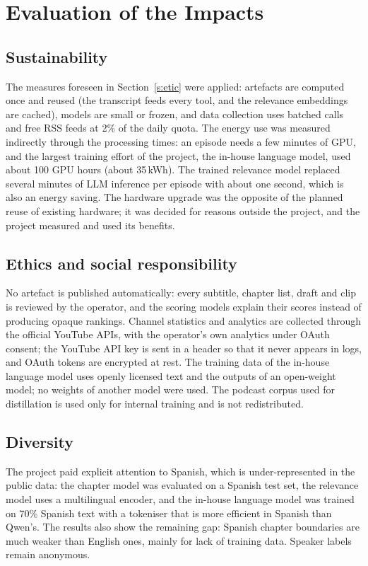 \section{Evaluation of the Impacts}

\subsection*{Sustainability}

The measures foreseen in Section~\ref{s:etic} were applied: artefacts are computed once and reused (the transcript feeds every tool, and the relevance embeddings are cached), models are small or frozen, and data collection uses batched calls and free RSS feeds at 2\% of the daily quota. The energy use was measured indirectly through the processing times: an episode needs a few minutes of GPU, and the largest training effort of the project, the in-house language model, used about 100 GPU hours (about 35\,kWh). The trained relevance model replaced several minutes of LLM inference per episode with about one second, which is also an energy saving. The hardware upgrade was the opposite of the planned reuse of existing hardware; it was decided for reasons outside the project, and the project measured and used its benefits.

\subsection*{Ethics and social responsibility}

No artefact is published automatically: every subtitle, chapter list, draft and clip is reviewed by the operator, and the scoring models explain their scores instead of producing opaque rankings. Channel statistics and analytics are collected through the official YouTube APIs, with the operator's own analytics under OAuth consent; the YouTube API key is sent in a header so that it never appears in logs, and OAuth tokens are encrypted at rest. The training data of the in-house language model uses openly licensed text and the outputs of an open-weight model; no weights of another model were used. The podcast corpus used for distillation is used only for internal training and is not redistributed.

\subsection*{Diversity}

The project paid explicit attention to Spanish, which is under-represented in the public data: the chapter model was evaluated on a Spanish test set, the relevance model uses a multilingual encoder, and the in-house language model was trained on 70\% Spanish text with a tokeniser that is more efficient in Spanish than Qwen's. The results also show the remaining gap: Spanish chapter boundaries are much weaker than English ones, mainly for lack of training data. Speaker labels remain anonymous.

